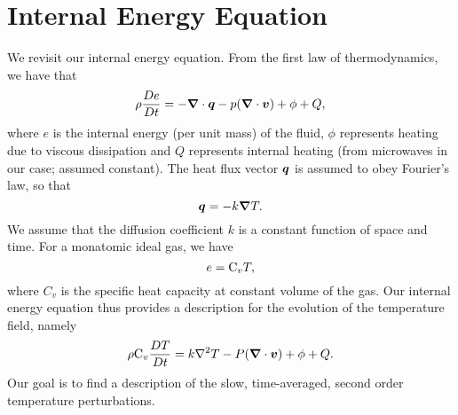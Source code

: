 \section{Internal Energy Equation}
We revisit our internal energy equation.  From the first law of thermodynamics, we have that 
\begin{equation}
\rho \frac{De}{Dt} = -\boldsymbol{\nabla}\cdot\boldsymbol{q} - p(\boldsymbol{\nabla}\cdot\boldsymbol{v}) + \phi + Q ,
\end{equation}
where $e$ is the internal energy (per unit mass) of the fluid, $\phi$ represents heating due to viscous dissipation and $Q$ represents internal heating (from microwaves in our case; assumed constant).  The heat flux vector $\boldsymbol{q}$ is assumed to obey Fourier's law, so that
\begin{equation}
\boldsymbol{q} = -k\boldsymbol{\nabla} T.
\end{equation}
We assume that the diffusion coefficient $k$ is a constant function of space and time.  For a monatomic ideal gas, we have 
\begin{equation}
e = \mathrm{C}_v T,
\end{equation}
where $C_v$ is the specific heat capacity at constant volume of the gas.  Our internal energy equation thus provides a description for the evolution of the temperature field, namely
\begin{equation}
\label{eq:internal}
\rho \mathrm{C}_v\frac{DT}{Dt} = k\nabla^2 T - P(\boldsymbol{\nabla}\cdot\boldsymbol{v}) + \phi + Q. 
\end{equation}
Our goal is to find a description of the slow, time-averaged, second order temperature perturbations.

